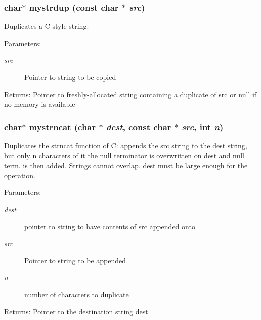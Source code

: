 \subsubsection{\setlength{\rightskip}{0pt plus 5cm}char$\ast$ mystrdup (const char $\ast$ {\em src})}\label{mystring_8c_148a52c665d88f52fb4995338a319d3c}


Duplicates a C-style string. \begin{Desc}
\item[Parameters:]
\begin{description}
\item[{\em src}]Pointer to string to be copied \end{description}
\end{Desc}
\begin{Desc}
\item[Returns:]Pointer to freshly-allocated string containing a duplicate of src or null if no memory is available \end{Desc}
\subsubsection{\setlength{\rightskip}{0pt plus 5cm}char$\ast$ mystrncat (char $\ast$ {\em dest}, const char $\ast$ {\em src}, int {\em n})}\label{mystring_8c_5118ef3a602744c5ee61e5b366cb3a02}


Duplicates the strncat function of C: appends the src string to the dest string, but only n characters of it the null terminator is overwritten on dest and null term. is then added. Strings cannot overlap. dest must be large enough for the operation. \begin{Desc}
\item[Parameters:]
\begin{description}
\item[{\em dest}]pointer to string to have contents of src appended onto \item[{\em src}]Pointer to string to be appended \item[{\em n}]number of characters to duplicate \end{description}
\end{Desc}
\begin{Desc}
\item[Returns:]Pointer to the destination string dest \end{Desc}
